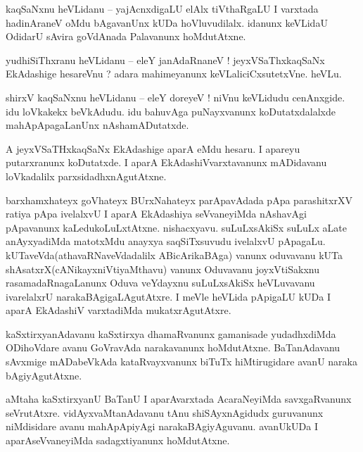 \documentclass{article}
\begin{document}
\begin{mn}%
kaqSaNxnu heVLidanu -- yajAcnxdigaLU elAlx tiVthaRgaLU I varxtada hadinAraneV oMdu bAgavanUnx kUDa 
hoVluvudilalx. idanunx keVLidaU OdidarU sAvira goVdAnada Palavanunx hoMdutAtxne.
\end{mn}


\begin{mn}%
yudhiSiThxranu heVLidanu -- eleY janAdaRnaneV ! jeyxVSaThxkaqSaNx EkAdashige hesareVnu ? adara 
mahimeyanunx keVLaliciCxsutetxVne. heVLu.
\end{mn}

\begin{mn}%
shirxV kaqSaNxnu heVLidanu -- eleY doreyeV ! niVnu keVLidudu cenAnxgide. idu loVkakekx beVkAdudu. 
idu bahuvAga puNayxvanunx koDutatxdalalxde mahApApagaLanUnx nAshamADutatxde.
\end{mn}

\begin{mn}%
A jeyxVSaTHxkaqSaNx EkAdashige aparA eMdu hesaru. I apareyu putarxranunx koDutatxde. I aparA 
EkAdashiVvarxtavanunx mADidavanu loVkadalilx parxsidadhxnAgutAtxne.
\end{mn}

\begin{mn}%
barxhamxhateyx goVhateyx BUrxNahateyx parApavAdada pApa parashitxrXV ratiya pApa ivelalxvU I aparA 
EkAdashiya seVvaneyiMda nAshavAgi pApavanunx kaLedukoLuLxtAtxne. nishacxyavu. suLuLxsAkiSx suLuLx 
aLate anAyxyadiMda matotxMdu anayxya saqSiTxsuvudu ivelalxvU pApagaLu. 
kUTaveVda(athavaRNaveVdadalilx ABicArikaBAga) vanunx oduvavanu kUTa 
shAsatxrX(cANikayxniVtiyaMthavu) vanunx Oduvavanu joyxVtiSakxnu rasamadaRnagaLanunx Oduva 
veYdayxnu suLuLxsAkiSx heVLuvavanu ivarelalxrU narakaBAgigaLAgutAtxre. I meVle heVLida pApigaLU 
kUDa I aparA EkAdashiV varxtadiMda mukatxrAgutAtxre.
\end{mn}

\begin{mn}%
kaSxtirxyanAdavanu kaSxtirxya dhamaRvanunx gamanisade yudadhxdiMda ODihoVdare avanu GoVravAda 
narakavanunx hoMdutAtxne. BaTanAdavanu sAvxmige mADabeVkAda kataRvayxvanunx biTuTx hiMtirugidare 
avanU naraka bAgiyAgutAtxne.
\end{mn}

\begin{mn}%
aMtaha kaSxtirxyanU BaTanU I aparAvarxtada AcaraNeyiMda savxgaRvanunx seVrutAtxre. 
vidAyxvaMtanAdavanu tAnu shiSAyxnAgidudx guruvanunx niMdisidare avanu mahApApiyAgi 
narakaBAgiyAguvanu. avanUkUDa I aparAseVvaneyiMda sadagxtiyanunx hoMdutAtxne.
\end{mn}
\end{document}
